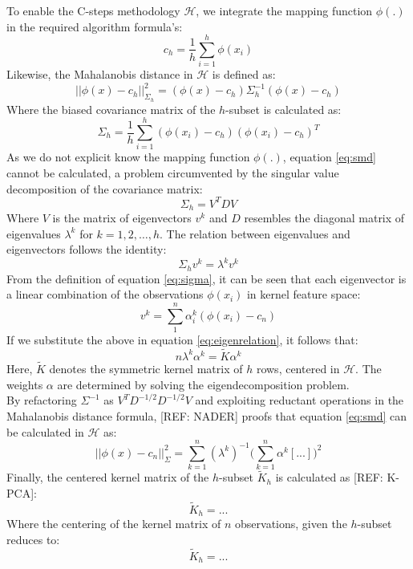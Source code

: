 \documentclass[preprint,12pt]{elsarticle}
\begin{document}
To enable the C-steps methodology $\mathcal{H}$, we integrate the mapping function $\phi(.)$ in the required algorithm formula's: 
\begin{equation}
	\label{eq:center}
	c_h = \frac{1}{h} \sum_{i=1}^{h}\phi(x_i)
\end{equation}
Likewise, the Mahalanobis distance in $\mathcal{H}$ is defined as:
\begin{equation}
	\label{eq:smd}
	||\phi(x) - c_h||^2_{\Sigma_h} = (\phi(x) - c_h) \Sigma^{-1}_h (\phi(x) - c_h)
\end{equation}
Where the biased covariance matrix of the $h$-subset is calculated as:
\begin{equation}
	\Sigma_h = \frac{1}{h} \sum_{i=1}^{h} (\phi(x_i) - c_h) (\phi(x_i) - c_h)^T
	\label{eq:sigma}
\end{equation}
As we do not explicit know the mapping function $\phi(.)$, equation \ref{eq:smd} cannot be calculated, a problem circumvented by the singular value decomposition of the covariance matrix:
\begin{equation}
	\Sigma_h = V^T D V
\end{equation}
Where $V$ is the matrix of eigenvectors $v^k$ and $D$ resembles the diagonal matrix of eigenvalues $\lambda^k$ for $k=1,2, \dots, h$. The relation between eigenvalues and eigenvectors follows the identity:
\begin{equation}
	\label{eq:eigenrelation}
	\Sigma_h v^k = \lambda^k v^k
\end{equation} 
From the definition of equation \ref{eq:sigma}, it can be seen that each eigenvector is a linear combination of the observations $\phi(x_i)$ in kernel feature space:
\begin{equation}
v^k = \sum_{1}^{n} \alpha_i^k ( \phi(x_i) - c_n) 
\end{equation}
If we substitute the above in equation \ref{eq:eigenrelation}, it follows that:
\begin{equation}
	n \lambda^k \alpha^k = \tilde{K} \alpha^k
\end{equation}
Here, $\tilde{K}$ denotes the symmetric kernel matrix of $h$ rows, centered in $\mathcal{H}$. The weights $\alpha$ are determined by solving the eigendecomposition problem. \\
By refactoring $\Sigma^{-1}$ as $V^T D^{-1/2} D^{-1/2} V$ and exploiting reductant operations in the Mahalanobis distance formula, [REF: NADER] proofs that equation \ref{eq:smd} can be calculated in $\mathcal{H}$ as:
\begin{equation}
	||\phi(x) - c_n||^2_{\Sigma} = \sum_{k=1}^{n} (\lambda^k)^{-1} \big( \sum_{k=1}^{n} \alpha^k [...]    \big)^2
\end{equation}	
Finally, the centered kernel matrix of the $h$-subset $\tilde{K}_h$ is calculated as [REF: K-PCA]:
\begin{equation}
	\tilde{K}_h = ...
\end{equation}
Where the centering of the kernel matrix of $n$ observations, given the $h$-subset reduces to: 
\begin{equation}
\tilde{K}_h = ...
\end{equation}
\end{document}
